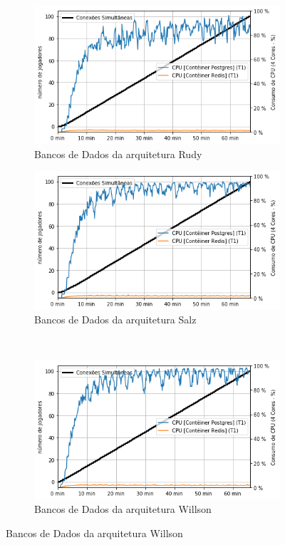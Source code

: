 \begin{figure}[htb!]
    \caption{Consumo de \ac{cpu} dos bancos de dados}
    \label{fig:experimento_db_cpu}

    \begin{subfigure}{0.5\textwidth}
        \centering
        \includegraphics[width=.95\linewidth]{figuras/testes/r_cpu_db.png}
        \caption{Bancos de Dados da arquitetura Rudy}
        \label{fig:r_cpu_db}
    \end{subfigure}%
    \begin{subfigure}{0.5\textwidth}
        \centering
        \includegraphics[width=.95\linewidth]{figuras/testes/s_cpu_db.png}
        \caption{Bancos de Dados da arquitetura Salz}
        \label{fig:s_cpu_db}
    \end{subfigure}\\

    \begin{subfigure}{0.5\textwidth}
        \centering
        \includegraphics[width=.95\linewidth]{figuras/testes/w_cpu_db.png}
        \caption{Bancos de Dados da arquitetura Willson}
        \label{fig:w_cpu_db}
    \end{subfigure}


\end{figure}

